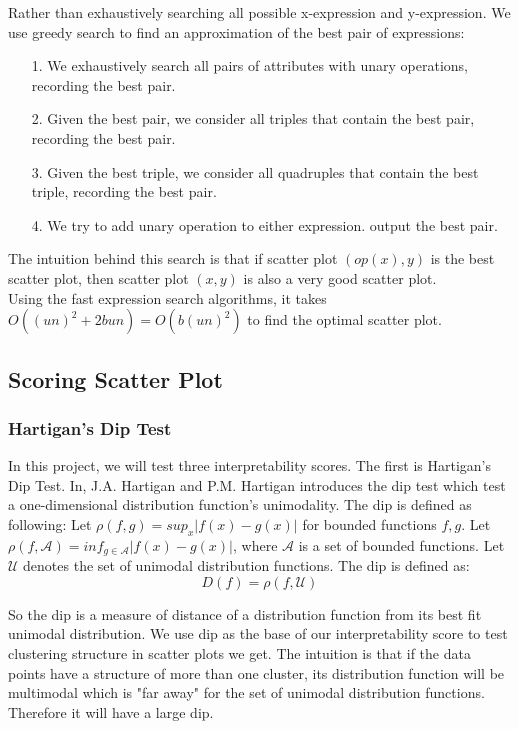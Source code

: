\documentclass[fleqn]{SelfArx} %
\begin{document}
Rather than exhaustively searching all possible x-expression and y-expression. We use greedy search to find an approximation of the best pair of expressions:

\begin{itemize}
\item[1.] We exhaustively search all pairs of attributes with unary operations, recording the best pair.
\item[2.] Given the best pair, we consider all triples that contain the best pair, recording the best pair.
\item[3.] Given the best triple, we consider all quadruples that contain the best triple, recording the best pair.
\item[4.] We try to add unary operation to either expression. output the best pair.
\end{itemize}

The intuition behind this search is that if scatter plot $(op(x), y)$ is the best scatter plot, then scatter plot $(x, y)$ is also a very good scatter plot.\\

Using the fast expression search algorithms, it takes $O((un)^2 + 2bun)=O(b(un)^2)$ to find the optimal scatter plot.
\subsection{Scoring Scatter Plot}
\subsubsection{Hartigan's Dip Test}


In this project, we will test three interpretability scores. The first is Hartigan's Dip Test. In\cite{dip}, J.A. Hartigan and P.M. Hartigan introduces the dip test which test a one-dimensional distribution function's unimodality. The dip is defined as following: Let $\rho(f,g)=sup_x|f(x)-g(x)|$ for bounded functions $f,g$. Let  $\rho(f,\mathscr{A})=inf_{g\in \mathscr{A}}|f(x)-g(x)|$, where $\mathscr{A}$ is a set of bounded functions. Let $\mathscr{U}$ denotes the set of unimodal distribution functions. The dip is defined as:
\begin{equation}
D(f)=\rho (f, \mathscr{U})
\end{equation}

So the dip is a measure of distance of a distribution function from its best fit unimodal distribution. We use dip as the base of our interpretability score to test clustering structure in scatter plots we get. The intuition is that if the data points have a structure of more than one cluster, its distribution function will be multimodal which is "far away" for the set of unimodal distribution functions. Therefore it will have a large dip.\\
\end{document}
